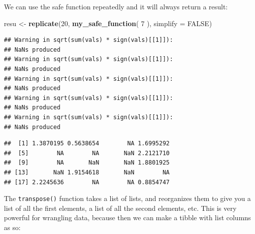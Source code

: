 \documentclass[
]{book}
\newenvironment{Shaded}{\begin{snugshade}}{\end{snugshade}}
\newcommand{\AttributeTok}[1]{\textcolor[rgb]{0.13,0.29,0.53}{#1}}
\newcommand{\ConstantTok}[1]{\textcolor[rgb]{0.56,0.35,0.01}{#1}}
\newcommand{\DecValTok}[1]{\textcolor[rgb]{0.00,0.00,0.81}{#1}}
\newcommand{\FunctionTok}[1]{\textcolor[rgb]{0.13,0.29,0.53}{\textbf{#1}}}
\newcommand{\NormalTok}[1]{#1}
\newcommand{\OtherTok}[1]{\textcolor[rgb]{0.56,0.35,0.01}{#1}}
\newcommand{\SpecialCharTok}[1]{\textcolor[rgb]{0.81,0.36,0.00}{\textbf{#1}}}
\begin{document}
We can use the safe function repeatedly and it will always return a result:

\begin{Shaded}
\begin{Highlighting}[]
\NormalTok{resu }\OtherTok{\textless{}{-}} \FunctionTok{replicate}\NormalTok{(}\DecValTok{20}\NormalTok{, }\FunctionTok{my\_safe\_function}\NormalTok{( }\DecValTok{7}\NormalTok{ ), }\AttributeTok{simplify =} \ConstantTok{FALSE}\NormalTok{)}
\end{Highlighting}
\end{Shaded}

\begin{verbatim}
## Warning in sqrt(sum(vals) * sign(vals)[[1]]):
## NaNs produced
## Warning in sqrt(sum(vals) * sign(vals)[[1]]):
## NaNs produced
## Warning in sqrt(sum(vals) * sign(vals)[[1]]):
## NaNs produced
## Warning in sqrt(sum(vals) * sign(vals)[[1]]):
## NaNs produced
## Warning in sqrt(sum(vals) * sign(vals)[[1]]):
## NaNs produced
\end{verbatim}

\begin{Shaded}
\end{Shaded}

\begin{verbatim}
##  [1] 1.3870195 0.5638654        NA 1.6995292
##  [5]        NA        NA       NaN 2.2121710
##  [9]        NA       NaN       NaN 1.8801925
## [13]       NaN 1.9154618       NaN        NA
## [17] 2.2245636        NA        NA 0.8854747
\end{verbatim}

The \texttt{transpose()} function takes a list of lists, and reorganizes them to give you a list of all the first elements, a list of all the second elements, etc.
This is very powerful for wrangling data, because then we can make a tibble with list columns as so:

\begin{Shaded}
\end{Shaded}
\end{document}
